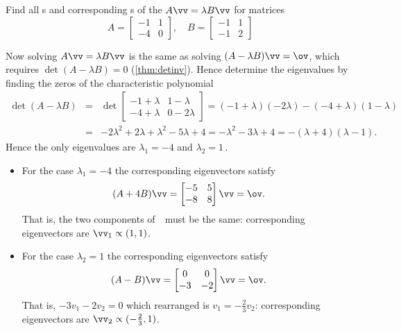 \begin{example} 
Find all s and corresponding s of the  \(A\vv=\lambda B\vv\) for matrices
\begin{equation*}
A=\begin{bmatrix} -1&1\\-4&0 \end{bmatrix},\quad
B=\begin{bmatrix} -1&1\\-1&2 \end{bmatrix}
\end{equation*}
\begin{solution} 
Now solving \(A\vv=\lambda B\vv\) is the same as solving \((A-\lambda B)\vv=\ov\), which requires \(\det(A-\lambda B)=0\) (\cref{thm:detinv}).
Hence determine the eigenvalues by finding the zeros of the characteristic polynomial
\begin{eqnarray*}
\det(A-\lambda B)
&=&\det\begin{bmatrix} -1+\lambda&1-\lambda\\-4+\lambda&0-2\lambda \end{bmatrix}
=(-1+\lambda)(-2\lambda)-(-4+\lambda)(1-\lambda)
\\&=&-2\lambda^2+2\lambda+\lambda^2-5\lambda+4
=-\lambda^2-3\lambda+4
=-(\lambda+4)(\lambda-1).
\end{eqnarray*}
Hence the only eigenvalues are \(\lambda_1=-4\) and \(\lambda_2=1\)\,.
\begin{itemize}
\item For the case \(\lambda_1=-4\) the corresponding eigenvectors satisfy
\begin{equation*}
(A+4B)\vv=\begin{bmatrix} -5&5\\-8&8 \end{bmatrix}\vv=\ov.
\end{equation*}
That is, the two components of~\vv\ must be the same: corresponding eigenvectors are \(\vv_1\propto(1,1)\).

\item For the case \(\lambda_2=1\) the corresponding eigenvectors satisfy
\begin{equation*}
(A-B)\vv=\begin{bmatrix} 0&0\\-3&-2 \end{bmatrix}\vv=\ov.
\end{equation*}
That is, \(-3v_1-2v_2=0\) which rearranged is \(v_1=-\tfrac23v_2\): corresponding eigenvectors are \(\vv_2\propto(-\tfrac23,1)\).
\end{itemize}
\end{solution}
\end{example}




